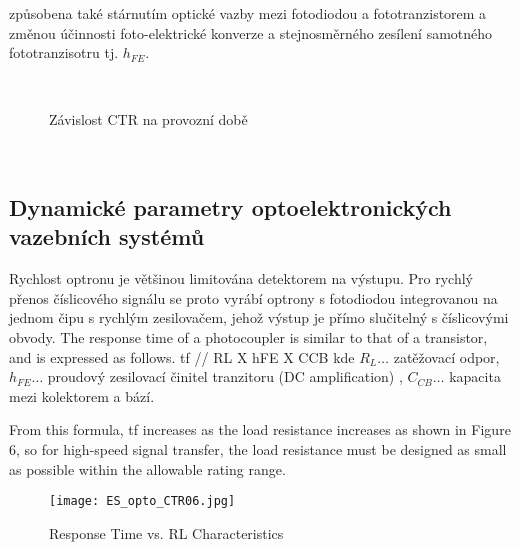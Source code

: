 \begin{itemize}
                způsobena také stárnutím optické vazby mezi fotodiodou a fototranzistorem a změnou
                účinnosti foto-elektrické konverze a stejnosměrného zesílení
                samotného fototranzisotru tj. \(h_{FE}\).              
                \begin{figure}[ht!]
                  \centering
                    {}   \\
                    {}   
                  \caption{Závislost CTR na provozní době}
                  \label{ES:fig_opto_CTRtime}
                \end{figure}
        \end{itemize}      
      \       
      \subsection{Dynamické parametry optoelektronických vazebních systémů}
        Rychlost optronu je většinou limitována detektorem na výstupu. Pro rychlý přenos číslicového
        signálu se proto vyrábí optrony s fotodiodou integrovanou na jednom čipu s rychlým
        zesilovačem, jehož výstup je přímo slučitelný s číslicovými obvody. 
        The response time of a photocoupler is similar to that of a transistor, and is expressed as
        follows. tf // RL X hFE X CCB kde \(R_L\ldots\) zatěžovací odpor, \(h_{FE}\ldots\) proudový
        zesilovací činitel tranzitoru (DC amplification) , \(C_{CB}\ldots\) kapacita mezi kolektorem
        a bází.
                      
        From this formula, tf increases as the load resistance increases as shown in Figure 6, so
        for high-speed signal transfer, the load resistance must be designed as small as possible
        within the allowable rating range.      
         \begin{figure}[ht!]
           \centering
           \texttt{[image: ES\_opto\_CTR06.jpg]}
           \caption{Response Time vs. RL Characteristics }
           \label{es:fig_opto_CTR06}
         \end{figure}      
      
